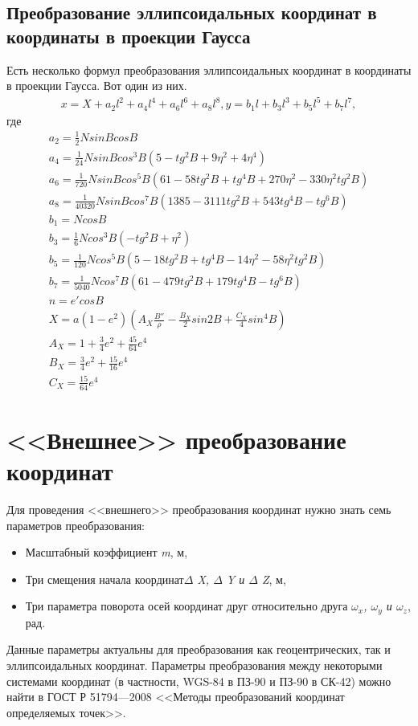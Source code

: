 \documentclass[12pt]{report}
\begin{document}
\subsection*{Преобразование эллипсоидальных координат в координаты в проекции Гаусса}
Есть несколько формул преобразования эллипсоидальных координат в координаты в проекции Гаусса. Вот один из них.
\begin{eqnarray}
x = X + a_2 l^2 + a_4 l^4 + a_6 l^6 + a_8 l^8, y = b_1 l + b_3 l^3 + b_5 l^5 + b_7 l^7,
\end{eqnarray}
где
\begin{eqnarray*}
a_2 = \frac{1}{2} N sinB cosB
\\
a_4 = \frac{1}{24} N sinB cos^3 B(5 - tg^2 B + 9 \eta^2 + 4 \eta^4)
\\
a_6 = \frac{1}{720} N sinB cos^5 B(61 - 58 tg^2 B + tg^4 B + 270 \eta^2 - 330 \eta^2 tg^2 B)
\\
a_8 = \frac{1}{40320} N sinB cos^7 B(1385 - 3111 tg^2 B + 543 tg^4 B - tg^6 B)
\\
b_1 = N cos B
\\
b_3 = \frac {1}{6} N cos^3 B(-tg^2B + \eta^2)
\\
b_5 = \frac {1}{120}N cos^5 B(5 - 18 tg^2 B + tg^4 B - 14 \eta^2 - 58 \eta^2 tg^2 B)
\\
b_7 = \frac{1}{5040} N cos^7 B (61 - 479 tg^2 B + 179 tg^4 B - tg^6 B)
\\
n = e' cos B
\\
X = a(1 - e^2)(A_X \frac {B''}{\rho} - \frac{B_X}{2} sin 2B + \frac{C_X}{4}sin^4 B)
\\
A_X = 1 + \frac{3}{4}e^2 + \frac{45}{64}e^4
\\
B_X = \frac{3}{4} e^2 + \frac{15}{16}e^4
\\
C_X = \frac {15}{64}e^4
\end{eqnarray*}
\section*{<<Внешнее>> преобразование координат}
Для проведения <<внешнего>> преобразования координат нужно знать семь параметров преобразования:
\begin{itemize}
\item Масштабный коэффициент \textit{m}, м,
\item Три смещения начала координат\textit{$\Delta$ X, $\Delta$ Y и $\Delta$ Z}, м,
\item Три параметра поворота осей координат друг относительно друга \textit{$\omega_x$, $\omega_y$ и $\omega_z$}, рад.
\end{itemize}
Данные параметры актуальны для преобразования как геоцентрических, так и эллипсоидальных координат. Параметры преобразования между некоторыми системами координат (в частности, WGS-84 в ПЗ-90 и ПЗ-90 в СК-42) можно найти в ГОСТ Р 51794---2008 <<Методы преобразований координат определяемых точек>>.
\end{document}
